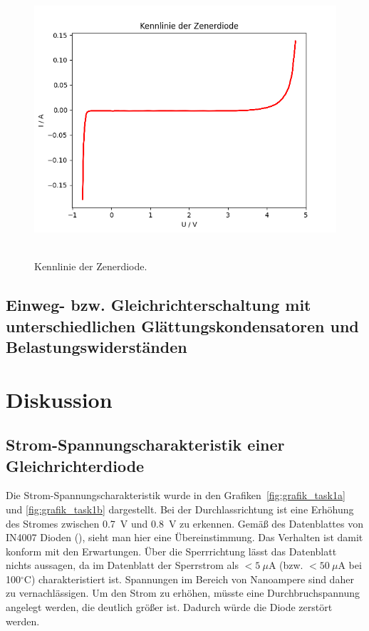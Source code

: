 \documentclass{article}
\begin{document}
\begin{figure}[H]
\caption{Kennlinie der Zenerdiode.}
\label{fig:task2_auswertung2}
{\centering
\includegraphics[scale=0.6]{bilder/task2_IU.png}
~
}
\end{figure}



\subsection{Einweg- bzw. Gleichrichterschaltung mit unterschiedlichen Glättungskondensatoren und Belastungswiderständen}



\section{Diskussion}

\subsection{Strom-Spannungscharakteristik einer Gleichrichterdiode}

Die Strom-Spannungscharakteristik wurde in den Grafiken~\ref{fig:grafik_task1a} und \ref{fig:grafik_task1b} dargestellt. Bei der Durchlassrichtung ist eine Erhöhung des Stromes zwischen 0.7~V und 0.8~V zu erkennen. Gemäß des Datenblattes von IN4007 Dioden (\cite{conrad_diode1}), sieht man hier eine Übereinstimmung. Das Verhalten ist damit konform mit den Erwartungen. Über die Sperrrichtung lässt das Datenblatt nichts aussagen, da im Datenblatt der Sperrstrom als $<5~\mu$A (bzw. $<50~\mu$A bei 100$^\circ$C) charakteristiert ist. Spannungen im Bereich von Nanoampere sind daher zu vernachlässigen. Um den Strom zu erhöhen, müsste eine Durchbruchspannung angelegt werden, die deutlich größer ist. Dadurch würde die Diode zerstört werden.
\end{document}
